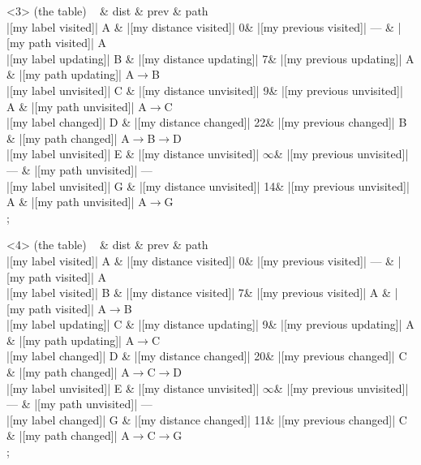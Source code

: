 \begin{onlyenv}<3>
 (the table) {
~ \& dist \& prev \& path \\
|[my label visited]| A \& |[my distance visited]| 0\& |[my previous visited]| --- \& |[my path visited]| A\\
|[my label updating]| B \& |[my distance updating]| 7\& |[my previous updating]| A \& |[my path updating]| A$\rightarrow$B\\
|[my label unvisited]| C \& |[my distance unvisited]| 9\& |[my previous unvisited]| A \& |[my path unvisited]| A$\rightarrow$C\\
|[my label changed]| D \& |[my distance changed]| 22\& |[my previous changed]| B \& |[my path changed]| A$\rightarrow$B$\rightarrow$D\\
|[my label unvisited]| E \& |[my distance unvisited]| $\infty$\& |[my previous unvisited]| --- \& |[my path unvisited]| ---\\
|[my label unvisited]| G \& |[my distance unvisited]| 14\& |[my previous unvisited]| A \& |[my path unvisited]| A$\rightarrow$G\\
};
\end{onlyenv}
            
\begin{onlyenv}<4>
 (the table) {
~ \& dist \& prev \& path \\
|[my label visited]| A \& |[my distance visited]| 0\& |[my previous visited]| --- \& |[my path visited]| A\\
|[my label visited]| B \& |[my distance visited]| 7\& |[my previous visited]| A \& |[my path visited]| A$\rightarrow$B\\
|[my label updating]| C \& |[my distance updating]| 9\& |[my previous updating]| A \& |[my path updating]| A$\rightarrow$C\\
|[my label changed]| D \& |[my distance changed]| 20\& |[my previous changed]| C \& |[my path changed]| A$\rightarrow$C$\rightarrow$D\\
|[my label unvisited]| E \& |[my distance unvisited]| $\infty$\& |[my previous unvisited]| --- \& |[my path unvisited]| ---\\
|[my label changed]| G \& |[my distance changed]| 11\& |[my previous changed]| C \& |[my path changed]| A$\rightarrow$C$\rightarrow$G\\
};
\end{onlyenv}
            
